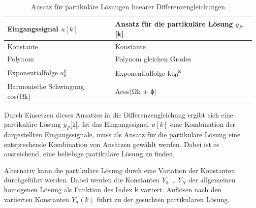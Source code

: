 \begin{table}
  \centering
  \caption{Ansatz für partikuläre Lösungen linearer Differenzengleichungen}
  \begin{tabular}{ll}
    \toprule
    Eingangssignal \(u[k]\) & Ansatz für die partikuläre Lösung \(y_{P}\){[}k{]} \\
    \midrule
    Konstante & Konstante \\
    Polynom & Polynom gleichen Grades \\
    Exponentialfolge \(u_{0}^{k}\) & Exponentialfolge ku\textsubscript{0}\textsuperscript{k} \\
    Harmonische Schwingung cos(Ωk) & Acos(Ωk + ϕ) \\
    \bottomrule
  \end{tabular}
\end{table}

Durch Einsetzen dieses Ansatzes in die Differenzengleichung ergibt sich eine partikuläre Lösung \(y_{P}\){[}k{]}. Ist das Eingangssignal \(u[k]\) eine Kombination der dargestellten Eingangssignale, muss als Ansatz für die partikuläre Lösung eine entsprechende Kombination von Ansätzen gewählt werden. Dabei ist es ausreichend, eine beliebige partikuläre Lösung zu finden.

Alternativ kann die partikuläre Lösung durch eine Variation der Konstanten durchgeführt werden. Dabei werden die Konstanten \(Y_{0}\) \ldots{} \(Y_{N}\) der allgemeinen homogenen Lösung als Funktion des Index k variiert. Auflösen nach den variierten Konstanten \(Y_{n}(k)\) führt zu der gesuchten partikulären Lösung.

